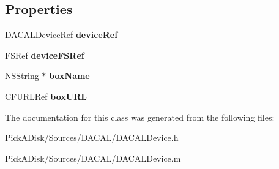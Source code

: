 \subsection*{Properties}
\begin{DoxyCompactItemize}
\item 
\hypertarget{interface_d_a_c_a_l_device_aea05d7976ed831c328f29758393dafbf}{
DACALDeviceRef {\bfseries deviceRef}}
\label{interface_d_a_c_a_l_device_aea05d7976ed831c328f29758393dafbf}

\item 
\hypertarget{interface_d_a_c_a_l_device_a2f4b42ce17b579813f8c343008381bcb}{
FSRef {\bfseries deviceFSRef}}
\label{interface_d_a_c_a_l_device_a2f4b42ce17b579813f8c343008381bcb}

\item 
\hypertarget{interface_d_a_c_a_l_device_a08eb1508c1a52d3eb00a524b5f0a7b23}{
\hyperlink{class_n_s_string}{NSString} $\ast$ {\bfseries boxName}}
\label{interface_d_a_c_a_l_device_a08eb1508c1a52d3eb00a524b5f0a7b23}

\item 
\hypertarget{interface_d_a_c_a_l_device_a3ed5ac731de467f784dc932ea435a0bd}{
CFURLRef {\bfseries boxURL}}
\label{interface_d_a_c_a_l_device_a3ed5ac731de467f784dc932ea435a0bd}

\end{DoxyCompactItemize}


The documentation for this class was generated from the following files:\begin{DoxyCompactItemize}
\item 
PickADisk/Sources/DACAL/DACALDevice.h\item 
PickADisk/Sources/DACAL/DACALDevice.m\end{DoxyCompactItemize}
